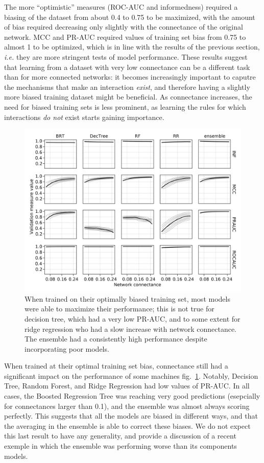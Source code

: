 \documentclass[11pt]{article}
\makeatletter
\def\maxwidth{\ifdim\Gin@nat@width>\linewidth\linewidth
\else\Gin@nat@width\fi}
\let\Oldincludegraphics\includegraphics
\renewcommand{\includegraphics}[1]{\Oldincludegraphics[width=\maxwidth]{#1}}
\makeatother
\begin{document}
The more ``optimistic'' measures (ROC-AUC and informedness) required a
biasing of the dataset from about 0.4 to 0.75 to be maximized, with the
amount of bias required decreasing only slightly with the connectance of
the original network. MCC and PR-AUC required values of training set
bias from 0.75 to almost 1 to be optimized, which is in line with the
results of the previous section, \emph{i.e.} they are more stringent
tests of model performance. These results suggest that learning from a
dataset with very low connectance can be a different task than for more
connected networks: it becomes increasingly important to caputre the
mechanisms that make an interaction \emph{exist}, and therefore having a
slightly more biased training dataset might be beneficial. As
connectance increases, the need for biased training sets is less
prominent, as learning the rules for which interactions \emph{do not}
exist starts gaining importance.

\begin{figure}
\hypertarget{fig:optimperf}{%
\centering
\includegraphics{figures/optim_perf.png}
\caption{When trained on their optimally biased training set, most
models were able to maximize their performance; this is not true for
decision tree, which had a very low PR-AUC, and to some extent for ridge
regression who had a slow increase with network connectance. The
ensemble had a consistently high performance despite incorporating poor
models.}\label{fig:optimperf}
}
\end{figure}

When trained at their optimal training set bias, connectance still had a
significant impact on the performance of some machines
fig.~\ref{fig:optimperf}. Notably, Decision Tree, Random Forest, and
Ridge Regression had low values of PR-AUC. In all cases, the Boosted
Regression Tree was reaching very good predictions (esepcially for
connectances larger than 0.1), and the ensemble was almost always
scoring perfectly. This suggests that all the models are biased in
different ways, and that the averaging in the ensemble is able to
correct these biases. We do not expect this last result to have any
generality, and provide a discussion of a recent exemple in which the
ensemble was performing worse than its components models.
\end{document}
